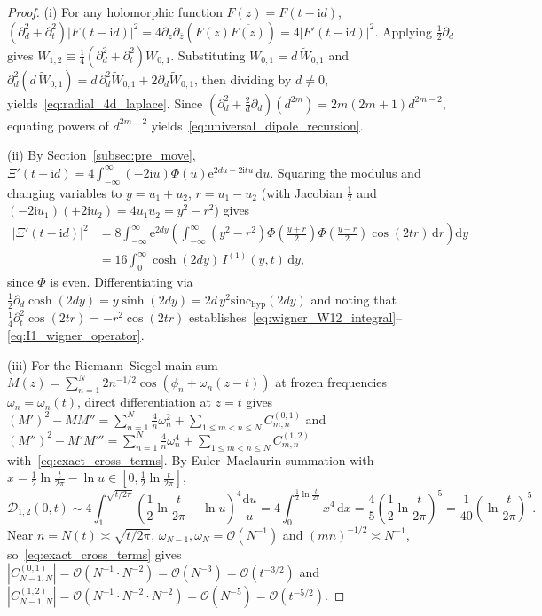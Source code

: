 \documentclass[11pt,reqno]{amsart}
\theoremstyle{definition}
\theoremstyle{remark}
\numberwithin{equation}{section}
\newcommand{\dd}{\mathrm{d}}
\newcommand{\ee}{\mathrm{e}}
\newcommand{\ii}{\mathrm{i}}
\newcommand{\sinch}{\mathrm{sinc}_{\mathrm{hyp}}}
\begin{document}
\begin{proof}
(i) For any holomorphic function $F(z) = F(t-\ii d)$, $(\partial_d^2 + \partial_t^2)|F(t-\ii d)|^2 = 4\partial_z\partial_{\bar{z}}(F(z)\overline{F(z)}) = 4|F'(t-\ii d)|^2$. Applying $\frac{1}{2}\partial_d$ gives $W_{1,2} \equiv \frac{1}{4}(\partial_d^2 + \partial_t^2)W_{0,1}$. Substituting $W_{0,1} = d\,\widetilde{W}_{0,1}$ and $\partial_d^2(d\,\widetilde{W}_{0,1}) = d\,\partial_d^2\widetilde{W}_{0,1} + 2\partial_d\widetilde{W}_{0,1}$, then dividing by $d \neq 0$, yields~\eqref{eq:radial_4d_laplace}. Since $(\partial_d^2 + \frac{2}{d}\partial_d)(d^{2m}) = 2m(2m+1)d^{2m-2}$, equating powers of $d^{2m-2}$ yields~\eqref{eq:universal_dipole_recursion}.

(ii) By Section~\ref{subsec:pre_move}, $\Xi'(t-\ii d) = 4\int_{-\infty}^\infty (-2\ii u)\Phi(u)\ee^{2du - 2\ii tu}\,\dd u$. Squaring the modulus and changing variables to $y = u_1 + u_2$, $r = u_1 - u_2$ (with Jacobian $\frac{1}{2}$ and $(-2\ii u_1)(+2\ii u_2) = 4u_1 u_2 = y^2 - r^2$) gives
\[
\begin{aligned}
\bigl|\Xi'(t-\ii d)\bigr|^2 &= 8\int_{-\infty}^\infty \ee^{2dy}\left(\int_{-\infty}^\infty (y^2 - r^2)\Phi\left(\frac{y+r}{2}\right)\Phi\left(\frac{y-r}{2}\right)\cos(2tr)\,\dd r\right)\dd y \\
&= 16\int_0^\infty \cosh(2dy)\,I^{(1)}(y,t)\,\dd y,
\end{aligned}
\]
since $\Phi$ is even. Differentiating via $\frac{1}{2}\partial_d\cosh(2dy) = y\sinh(2dy) = 2d\,y^2\sinch(2dy)$ and noting that $\frac{1}{4}\partial_t^2\cos(2tr) = -r^2\cos(2tr)$ establishes~\eqref{eq:wigner_W12_integral}--\eqref{eq:I1_wigner_operator}.

(iii) For the Riemann--Siegel main sum $M(z) = \sum_{n=1}^{N} 2n^{-1/2}\cos(\phi_n + \omega_n(z - t))$ at frozen frequencies $\omega_n = \omega_n(t)$, direct differentiation at $z = t$ gives $(M')^2 - MM'' = \sum_{n=1}^N \frac{4}{n}\omega_n^2 + \sum_{1\le m<n\le N} C_{m,n}^{(0,1)}$ and $(M'')^2 - M'M''' = \sum_{n=1}^N \frac{4}{n}\omega_n^4 + \sum_{1\le m<n\le N} C_{m,n}^{(1,2)}$ with~\eqref{eq:exact_cross_terms}. By Euler--Maclaurin summation with $x = \frac{1}{2}\ln\frac{t}{2\pi} - \ln u \in [0, \frac{1}{2}\ln\frac{t}{2\pi}]$,
\[
\mathcal{D}_{1,2}(0,t) \sim 4\int_1^{\sqrt{t/2\pi}} \left(\frac{1}{2}\ln\frac{t}{2\pi} - \ln u\right)^4 \frac{\dd u}{u} = 4\int_0^{\frac{1}{2}\ln\frac{t}{2\pi}} x^4\,\dd x = \frac{4}{5}\left(\frac{1}{2}\ln\frac{t}{2\pi}\right)^5 = \frac{1}{40}\left(\ln\frac{t}{2\pi}\right)^5.
\]
Near $n = N(t) \asymp \sqrt{t/2\pi}$, $\omega_{N-1}, \omega_N = \mathcal{O}(N^{-1})$ and $(mn)^{-1/2} \asymp N^{-1}$, so~\eqref{eq:exact_cross_terms} gives $|C_{N-1,N}^{(0,1)}| = \mathcal{O}(N^{-1}\cdot N^{-2}) = \mathcal{O}(N^{-3}) = \mathcal{O}(t^{-3/2})$ and $|C_{N-1,N}^{(1,2)}| = \mathcal{O}(N^{-1}\cdot N^{-2}\cdot N^{-2}) = \mathcal{O}(N^{-5}) = \mathcal{O}(t^{-5/2})$.
\end{proof}
\end{document}
